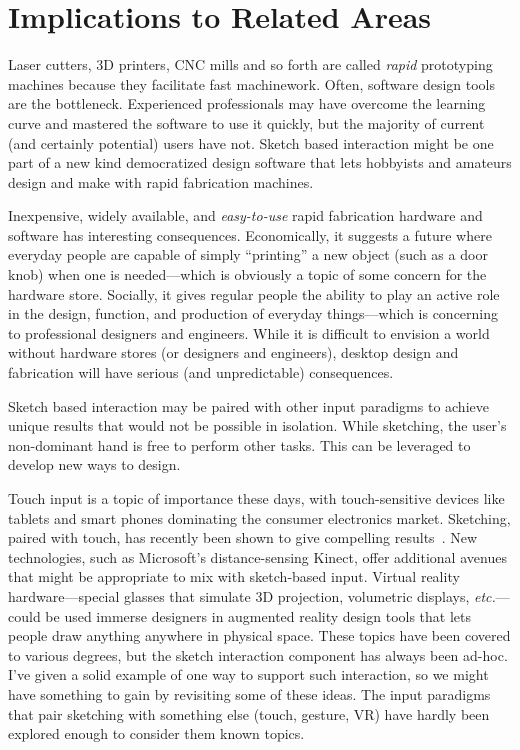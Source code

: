 \section{Implications to Related Areas}


Laser cutters, 3D printers, CNC mills and so forth are called
\textit{rapid} prototyping machines because they facilitate fast
machinework. Often, software design tools are the
bottleneck. Experienced professionals may have overcome the learning
curve and mastered the software to use it quickly, but the majority of
current (and certainly potential) users have not. Sketch based
interaction might be one part of a new kind democratized design
software that lets hobbyists and amateurs design and make with rapid
fabrication machines.

Inexpensive, widely available, and \textit{easy-to-use} rapid
fabrication hardware and software has interesting
consequences. Economically, it suggests a future where everyday people
are capable of simply ``printing'' a new object (such as a door knob)
when one is needed---which is obviously a topic of some concern for
the hardware store. Socially, it gives regular people the ability to
play an active role in the design, function, and production of
everyday things---which is concerning to professional designers and
engineers. While it is difficult to envision a world without hardware
stores (or designers and engineers), desktop design and fabrication
will have serious (and unpredictable) consequences.

Sketch based interaction may be paired with other input paradigms to
achieve unique results that would not be possible in isolation. While
sketching, the user's non-dominant hand is free to perform other
tasks. This can be leveraged to develop new ways to design. 

Touch input is a topic of importance these days, with touch-sensitive
devices like tablets and smart phones dominating the consumer
electronics market. Sketching, paired with touch, has recently been
shown to give compelling results~\cite{hinckley-pen-touch}. New
technologies, such as Microsoft's distance-sensing Kinect, offer
additional avenues that might be appropriate to mix with sketch-based
input. Virtual reality hardware---special glasses that simulate 3D
projection, volumetric displays, \textit{etc.}---could be used immerse
designers in augmented reality design tools that lets people draw
anything anywhere in physical space\cite{jung-lightpen}. These topics
have been covered to various degrees, but the sketch interaction
component has always been ad-hoc. I've given a solid example of one
way to support such interaction, so we might have something to gain by
revisiting some of these ideas. The input paradigms that pair
sketching with something else (touch, gesture, VR) have hardly been
explored enough to consider them known topics.

